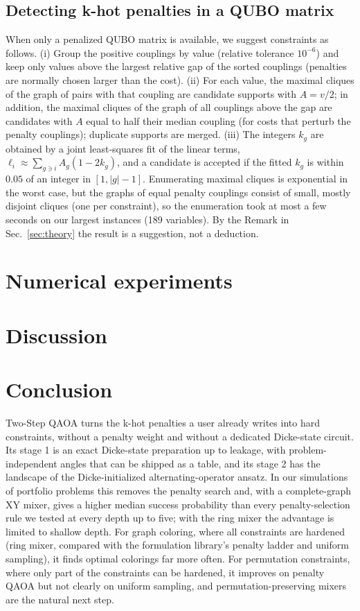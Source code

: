\documentclass{article}
\begin{document}
\subsection{Detecting k-hot penalties in a QUBO matrix}
\label{sec:detect}
When only a penalized QUBO matrix is available, we suggest constraints as follows.
(i) Group the positive couplings by value (relative tolerance $10^{-6}$) and keep only values above the largest relative gap of the sorted couplings (penalties are normally chosen larger than the cost).
(ii) For each value, the maximal cliques of the graph of pairs with that coupling are candidate supports with $A=v/2$; in addition, the maximal cliques of the graph of all couplings above the gap are candidates with $A$ equal to half their median coupling (for costs that perturb the penalty couplings); duplicate supports are merged.
(iii) The integers $k_g$ are obtained by a joint least-squares fit of the linear terms, $\ell_i\approx\sum_{g\ni i}A_g(1-2k_g)$, and a candidate is accepted if the fitted $k_g$ is within $0.05$ of an integer in $[1,|g|-1]$.
Enumerating maximal cliques is exponential in the worst case, but the graphs of equal penalty couplings consist of small, mostly disjoint cliques (one per constraint), so the enumeration took at most a few seconds on our largest instances (189 variables). By the Remark in Sec.~\ref{sec:theory} the result is a suggestion, not a deduction.

\section{Numerical experiments}
\label{sec:results}


\section{Discussion}
\label{sec:discussion}


\section{Conclusion}
Two-Step QAOA turns the k-hot penalties a user already writes into hard constraints, without a penalty weight and without a dedicated Dicke-state circuit.
Its stage 1 is an exact Dicke-state preparation up to leakage, with problem-independent angles that can be shipped as a table, and its stage 2 has the landscape of the Dicke-initialized alternating-operator ansatz.
In our simulations of portfolio problems this removes the penalty search and, with a complete-graph XY mixer, gives a higher median success probability than every penalty-selection rule we tested at every depth up to five; with the ring mixer the advantage is limited to shallow depth. For graph coloring, where all constraints are hardened (ring mixer, compared with the formulation library's penalty ladder and uniform sampling), it finds optimal colorings far more often. For permutation constraints, where only part of the constraints can be hardened, it improves on penalty QAOA but not clearly on uniform sampling, and permutation-preserving mixers are the natural next step.
\end{document}
